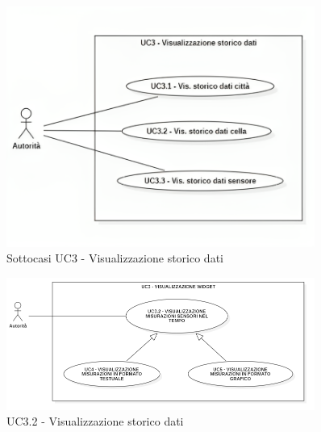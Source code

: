 \begin{figure}[H]
    \centering
    \includegraphics[width=0.9\textwidth]{../Images/uc3_Subcase.png}
    \caption{Sottocasi UC3 - Visualizzazione storico dati }
    \label{fig:UC3_sub}
\end{figure}





\begin{figure}[H]
    \centering
    \includegraphics[width=0.9\textwidth]{../Images/uc3_1Gen.PNG}
    \caption{UC3.2 - Visualizzazione storico dati }
    \label{fig:UC3_gen}
\end{figure}



